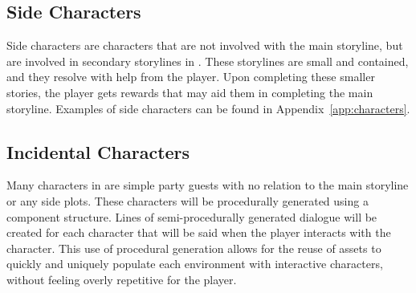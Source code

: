 \subsection{Side Characters}
Side characters are characters that are not involved with the main storyline, but are involved in secondary storylines in \ourgame{}. These storylines are small and contained, and they resolve with help from the player. Upon completing these smaller stories, the player gets rewards that may aid them in completing the main storyline. Examples of side characters can be found in Appendix~\ref{app:characters}.

\subsection{Incidental Characters}
Many characters in \ourgame{} are simple party guests with no relation to the main storyline or any side plots. These characters will be procedurally generated using a component structure. Lines of semi-procedurally generated dialogue will be created for each character that will be said when the player interacts with the character. This use of procedural generation allows for the reuse of assets to quickly and uniquely populate each environment with interactive characters, without feeling overly repetitive for the player.